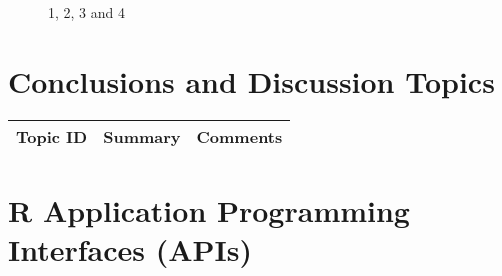 \begin{figure}[H]
	\centering
	\begin{minipage}[b]{0.5\linewidth}
	\end{minipage}\hfill
	\begin{minipage}[b]{0.5\linewidth}
	\end{minipage}\hfill	
	\begin{minipage}[b]{0.5\linewidth}
	\end{minipage}\hfill
	\begin{minipage}[b]{0.5\linewidth}
	\end{minipage}\hfill
	\caption{1, 2, 3 and 4}
	\label{fig:Figure1}
\end{figure} 



\section{Conclusions and Discussion Topics}

\begin{table}[H]\centering
	\begin{tabular}{p{1cm}p{4cm}p{3cm}}
		Topic ID & Summary & Comments\\
		\hline
		\hline
	\end{tabular}
\end{table}


\section{R Application Programming Interfaces (APIs)}



